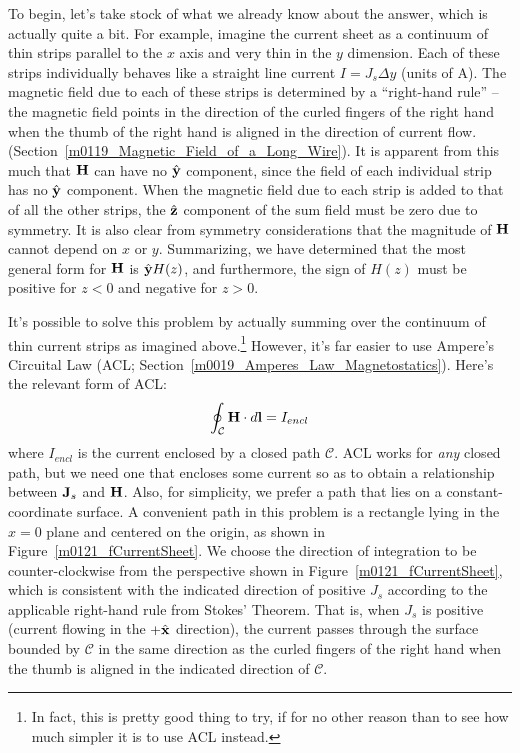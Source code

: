 To begin, let's take stock of what we already know about the answer, which is actually quite a bit.
For example, imagine the current sheet as a continuum of thin strips parallel to the $x$ axis and very thin in the $y$ dimension.  
Each of these strips individually behaves like a straight line current $I=J_s\Delta y$ (units of A).
The magnetic field due to each of these strips is determined by a ``right-hand rule'' -- 
the magnetic field points in the direction of the curled fingers of the right hand when the thumb of the right hand is aligned in the direction of current flow. (Section~\ref{m0119_Magnetic_Field_of_a_Long_Wire}).
It is apparent from this much that ${\bf H}$ can have no $\hat{\bf y}$ component, since the field of each individual strip has no $\hat{\bf y}$ component.
When the magnetic field due to each strip is added to that of all the other strips, the $\hat{\bf z}$ component of the sum field must be zero due to symmetry.
It is also clear from symmetry considerations that the magnitude of ${\bf H}$ cannot depend on $x$ or $y$. 
Summarizing, we have determined that the most general form for ${\bf H}$ is $\hat{\bf y}H(z)$, and furthermore, the sign of $H(z)$ must be positive for $z<0$ and negative for $z>0$.

It's possible to solve this problem by actually summing over the continuum of thin current strips as imagined above.\footnote{In fact, this is pretty good thing to try, if for no other reason than to see how much simpler it is to use ACL instead.}
However, it's far easier to use Ampere's Circuital Law 
(ACL; Section~\ref{m0019_Amperes_Law_Magnetostatics}).                        
Here's the relevant form of ACL:
%
\begin{equation}   
\oint_{\mathcal C}{ {\bf H} \cdot d{\bf l} } = I_{encl}  
\label{m0121_eACL}
\end{equation}
%
where $I_{encl}$ is the current enclosed by a closed path ${\mathcal C}$.
ACL works for {\it any} closed path, but we need one that encloses some current so as to obtain a relationship between ${\bf J}_s$ and ${\bf H}$.
Also, for simplicity, we prefer a path that lies on a constant-coordinate surface.
A convenient path in this problem is a rectangle lying in the $x=0$ plane and centered on the origin, as shown in Figure~\ref{m0121_fCurrentSheet}.
We choose the direction of integration to be counter-clockwise from the perspective shown in Figure~\ref{m0121_fCurrentSheet}, which is consistent with the indicated direction of positive $J_s$ according to the applicable right-hand rule
from Stokes' Theorem.
That is, when $J_s$ is positive (current flowing in the $+\hat{\bf x}$ direction), the current passes through the surface bounded by ${\mathcal C}$ in the same direction as the curled fingers of the right hand when the thumb is aligned in the indicated direction of ${\mathcal C}$. 

